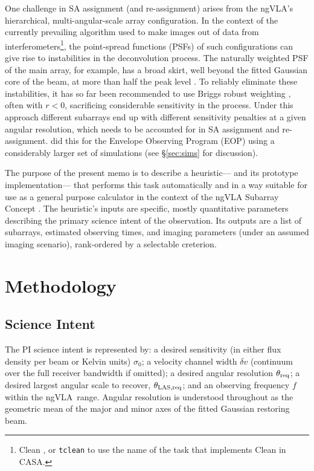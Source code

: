 \documentclass[11pt]{article}
\newcommand{\ngvla}{ngVLA}
\begin{document}
One challenge in SA assignment (and re-assignment) arises from the
\ngvla's hierarchical, multi-angular-scale array configuration.  In
the context of the currently prevailing algorithm used to make images
out of data from interferometers\footnote{Clean
\citep[e.g.][]{hogbom,clark, schwab}, or {\tt tclean} to use the name
of the task that implements Clean in CASA.}, the point-spread
functions (PSFs) of such configurations can give rise to instabilities
in the deconvolution process.  The naturally weighted PSF of the main
array, for example, has a broad skirt, well beyond the fitted Gaussian
core of the beam, at more than half the peak level
\citep{memo65,memo121}.  To reliably eliminate these instabilities, it
has so far been recommended \citep{memo65,memo72,memo76,memo106} to
use Briggs robust weighting \citep{briggs}, often with $r < 0$,
sacrificing considerable sensitivity in the process.  Under this
approach different subarrays end up with different sensitivity
penalties at a given angular resolution, which needs to be accounted
for in SA assignment and re-assignment.  \citep{memo121} did this for
the Envelope Observing Program (EOP) using a considerably larger set
of simulations (see \S\ref{sec:sims} for discussion).

The purpose of the present memo is to describe a heuristic--- and its
prototype implementation--- that performs this task automatically and
in a way suitable for use as a general purpose calculator in the
context of the ngVLA Subarray Concept \citep{saNarrative}. The heuristic's
inputs are specific, mostly quantitative parameters describing the
primary science intent of the observation. Its outputs are
a list of subarrays, estimated observing times, and imaging parameters (under
an assumed imaging scenario), rank-ordered by a selectable creterion.

\section{Methodology}
\label{sec:method}

\subsection{Science Intent}
\label{sec:scienceIntent}

The PI science intent is represented by: a desired sensitivity (in
either flux density per beam or Kelvin units) $\sigma_0$; a velocity
channel width $\delta v$ (continuum over the full receiver bandwidth
if omitted); a desired angular resolution $\theta_{\rm req}$; a
desired largest angular scale to recover, $\theta_{\rm LAS,req}$; and
an observing frequency $f$ within the \ngvla\ range.  Angular
resolution is understood throughout as the geometric mean of the
major and minor axes of the fitted Gaussian restoring beam.
\end{document}
